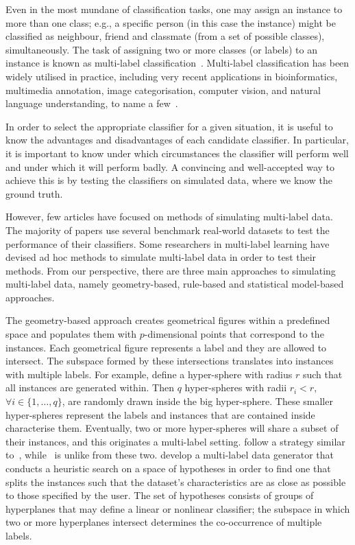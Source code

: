 \documentclass[review]{elsarticle}
\begin{document}
	Even in the most mundane of classification tasks, one may assign an instance to more than one class; e.g., a specific person (in this case the instance) might be classified as neighbour, friend and classmate (from a set of possible classes), simultaneously. The task of assigning two or more classes (or labels) to an instance is known as multi-label classification~\citep{Tsoumakas:07, de2009tutorial, zhang2014review, Gibaja:15}. Multi-label classification has been widely utilised in practice, including very recent applications in bioinformatics, multimedia annotation, image categorisation, computer vision, and natural language understanding, to name a few~\citep{Tsoumakas:07, zhang2014review, meng2016plant, li2016conditional, hou2016multi, ivasic2016two, wu2015multi, zhao2015multi, zhao2015joint, yang2016exploiting, li2015supervised, li2015centroid}.
	
	In order to select the appropriate classifier for a given situation, it is useful to know the advantages and disadvantages of each candidate classifier. In particular, it is important to know under which circumstances the classifier will perform well and under which it will perform badly. A convincing and well-accepted way to achieve this is by testing the classifiers on simulated data, where we know the ground truth. 
	
	However, few articles have focused on methods of simulating multi-label data. The majority of papers use several benchmark real-world datasets to test the performance of their classifiers. Some researchers in multi-label learning have devised ad hoc methods to simulate multi-label data in order to test their methods.
	From our perspective, there are three main approaches to simulating multi-label data, namely geometry-based, rule-based and statistical model-based approaches.
	
	The geometry-based approach creates geometrical figures within a predefined space and populates them with $p$-dimensional points that correspond to the instances. Each geometrical figure represents a label and they are allowed to intersect. The subspace formed by these intersections translates into instances with multiple labels. For example, \citet{EG4} define a hyper-sphere with radius $r$ such that all instances are generated within. Then $q$ hyper-spheres with radii $r_{i} < r,$ $\forall i \in \{1,\ldots,q\}$, are randomly drawn inside the big hyper-sphere. These smaller hyper-spheres represent the labels and instances that are contained inside characterise them. Eventually, two or more hyper-spheres will share a subset of their instances, and this originates a multi-label setting.
	\citet{MLG2} follow a strategy similar to~\citep{EG4}, while~\citet{MLG1} is unlike from these two. \citet{MLG1} develop a multi-label data generator that conducts a heuristic search on a space of hypotheses in order to find one that splits the instances such that the dataset's characteristics are as close as possible to those specified by the user. The set of hypotheses consists of groups of hyperplanes that may define a linear or nonlinear classifier; the subspace in which two or more hyperplanes intersect determines the co-occurrence of multiple labels. 
	
\end{document}
